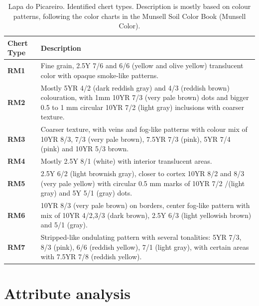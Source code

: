 \documentclass[12pt,twoside]{reedthesis}
\begin{document}
\begin{table}[!h]

\caption{\label{tab:cherttable}Lapa do Picareiro. Identified chert types. Description is mostly based on colour patterns, following the color charts in the Munsell Soil Color Book (Munsell Color).}
\centering
\fontsize{9}{11}\selectfont
\begin{tabular}[t]{>{\bfseries}l>{\raggedright\arraybackslash}p{10cm}}
\toprule
Chert Type & Description\\
\midrule
RM1 & Fine grain, 2.5Y 7/6 and 6/6 (yellow and olive yellow) translucent color with opaque smoke-like patterns.\\
RM2 & Mostly 5YR 4/2 (dark reddish gray) and 4/3 (reddish brown) colouration, with 1mm 10YR 7/3 (very pale brown) dots and bigger 0.5 to 1 mm circular 10YR 7/2 (light gray) inclusions with coarser texture.\\
RM3 & Coarser texture, with veins and fog-like patterns with colour mix of 10YR 8/3, 7/3 (very pale brown), 7.5YR 7/3 (pink), 5YR 7/4 (pink) and 10YR 5/3 brown.\\
RM4 & Mostly 2.5Y 8/1 (white) with interior translucent areas.\\
RM5 & 2.5Y 6/2 (light brownish gray), closer to cortex 10YR 8/2 and 8/3 (very pale yellow) with circular 0.5 mm marks of 10YR 7/2 /(light gray) and 5Y 5/1 (gray) dots.\\
\addlinespace
RM6 & 10YR 8/3 (very pale brown) on borders, center fog-like pattern with mix of 10YR 4/2,3/3 (dark brown), 2.5Y 6/3 (light yellowish brown) and 5/1 (gray).\\
RM7 & Stripped-like ondulating pattern with several tonalities: 5YR 7/3, 8/3 (pink), 6/6 (reddish yellow), 7/1 (light gray), with certain areas with 7.5YR 7/8 (reddish yellow).\\
\bottomrule
\end{tabular}
\end{table}
\hypertarget{attribute-analysis-1}{%
\chapter{Attribute analysis}\label{attribute-analysis-1}}
\end{document}

